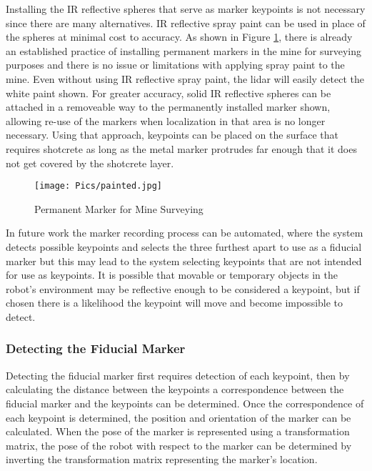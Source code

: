 Installing the IR reflective spheres that serve as marker keypoints is not necessary since there are many alternatives. IR reflective spray paint can be used in place of the spheres at minimal cost to accuracy. As shown in Figure \ref{fig:minepaint}, there is already an established practice of installing permanent markers in the mine for surveying purposes and there is no issue or limitations with applying spray paint to the mine. Even without using IR reflective spray paint, the \acrshort{lidar} will easily detect the white paint shown. For greater accuracy, solid IR reflective spheres can be attached in a removeable way to the permanently installed marker shown, allowing re-use of the markers when localization in that area is no longer necessary. Using that approach, keypoints can be placed on the surface that requires shotcrete as long as the metal marker protrudes far enough that it does not get covered by the shotcrete layer.\\

\begin{figure}[h]
    \centering
\texttt{[image: Pics/painted.jpg]} 
    \caption{Permanent Marker for Mine Surveying}
    \label{fig:minepaint}
\end{figure}

In future work the marker recording process can be automated, where the system detects possible keypoints and selects the three furthest apart to use as a fiducial marker but this may lead to the system selecting keypoints that are not intended for use as keypoints. It is possible that movable or temporary objects in the robot's environment may be reflective enough to be considered a keypoint, but if chosen there is a likelihood the keypoint will move and become impossible to detect.\\

\subsubsection{Detecting the Fiducial Marker}

Detecting the fiducial marker first requires detection of each keypoint, then by calculating the distance between the keypoints a correspondence between the fiducial marker and the keypoints can be determined. Once the correspondence of each keypoint is determined, the position and orientation of the marker can be calculated. When the pose of the marker is represented using a transformation matrix, the pose of the robot with respect to the marker can be determined by inverting the transformation matrix representing the marker's location.\\


